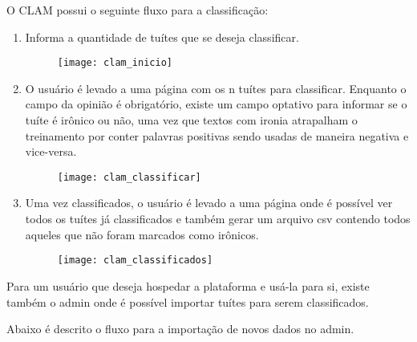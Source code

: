 O CLAM possui o seguinte fluxo para a classificação:

\begin{enumerate}
	\item Informa a quantidade de tuítes que se deseja classificar.
	\begin{figure}[H]
		\texttt{[image: clam\_inicio]}
	\end{figure}
	\item O usuário é levado a uma página com os n tuítes para classificar.
	Enquanto o campo da opinião é obrigatório, existe um campo optativo para informar
	se o tuíte é irônico ou não, uma vez que textos com ironia atrapalham
	o treinamento por conter palavras positivas sendo usadas de maneira negativa e vice-versa.
	\begin{figure}[H]
		\texttt{[image: clam\_classificar]}
	\end{figure}
	\item Uma vez classificados, o usuário é levado a uma página onde é possível ver todos
	os tuítes já classificados e também gerar um arquivo csv contendo todos aqueles
	que não foram marcados como irônicos.
	\begin{figure}[H]
		\texttt{[image: clam\_classificados]}
	\end{figure}
\end{enumerate}

Para um usuário que deseja hospedar a plataforma e usá-la para si, existe também o admin onde
é possível importar tuítes para serem classificados.

Abaixo é descrito o fluxo para a importação de novos dados no admin.

